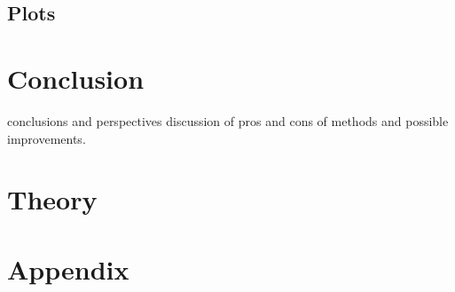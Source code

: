 \documentclass[sigconf, nonacm]{acmart}
\begin{document}
\subsection{Plots}
\section{Conclusion}
conclusions and perspectives
discussion of pros and cons of methods and possible improvements.

\section*{Theory}

\section*{Appendix}

\begin{acks}

\end{acks}




\end{document}
